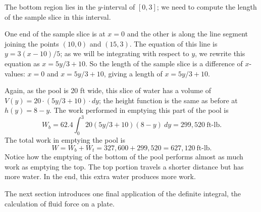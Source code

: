{The bottom region lies in the $y$-interval of $[0,3]$; we need to compute the length of the sample slice in this interval.

One end of the sample slice is at $x=0$ and the other is along the line segment joining the points $(10,0)$ and $(15,3)$. The equation of this line is $y= 3(x-10)/5$; as we will be integrating with respect to $y$, we rewrite this equation as $x=5y/3+10$. So the length of the sample slice is a difference of $x$-values: $x=0$ and $x=5y/3+10$, giving a length of $x=5y/3+10$. 

Again, as the pool is 20 ft wide, this slice of water has a volume of $V(y) = 20\cdot(5y/3+10)\cdot dy$; the height function is the same as before at $h(y)=8-y$. The work performed in emptying this part of the pool is
\[W_b = 62.4\int_0^3 20(5y/3+10)(8-y)\ dy = 299,520\ \text{ft-lb}.\]
The total work in emptying the pool is 
\[W = W_b+W_t = 327,600+299,520 = 627,120\ \text{ft-lb}.\]
Notice how the emptying of the bottom of the pool performs almost as much work as emptying the top. The top portion travels a shorter distance but has more water. In the end, this extra water produces more work.}

The next section introduces one final application of the definite integral, the calculation of fluid force on a plate.

